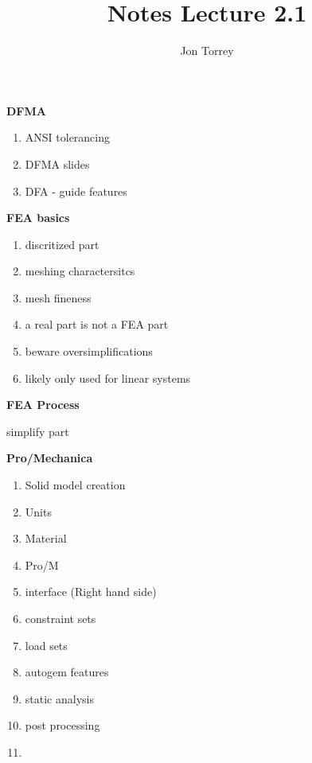 \documentclass{homework}
\title{Notes Lecture 2.1}
\author{Jon Torrey}
\begin{document}
\textbf{DFMA}

\begin{enumerate}
  \item ANSI tolerancing
  \item DFMA slides
  \item DFA - guide features
\end{enumerate}

\textbf{FEA basics}

\begin{enumerate}
  \item discritized part
  \item meshing charactersitcs
  \item mesh fineness
  \item a real part is not a FEA part
  \item beware oversimplifications
  \item likely only used for linear systems
\end{enumerate}

\textbf{FEA Process}

    \item simplify part  

\textbf{Pro/Mechanica}

\begin{enumerate}
    \item Solid model creation
    \item Units
    \item Material
    \item Pro/M
    \item interface (Right hand side)
    \item constraint sets
    \item load sets
    \item autogem features
    \item static analysis
    \item post processing
    \item 
\end{enumerate}
\end{document}
